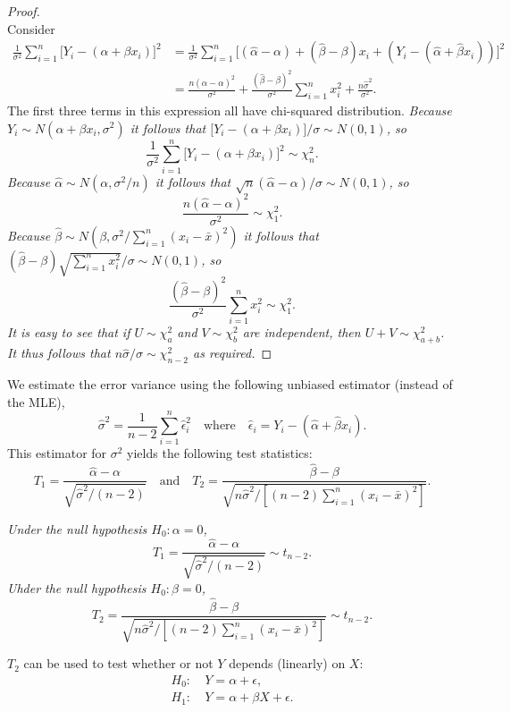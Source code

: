 \begin{proof}
\[\]
Consider
\begin{align*}
\frac{1}{\sigma^2}\sum_{i=1}^n\big[Y_i-(\alpha+\beta x_i)\big]^2 
	& = \frac{1}{\sigma^2}\sum_{i=1}^n\big[(\hat{\alpha}-\alpha) + (\hat{\beta}-\beta)x_i + (Y_i-(\hat{\alpha}+\hat{\beta}x_i))\big]^2 \\
	& = \frac{n(\hat{\alpha}-\alpha)^2}{\sigma^2} + \frac{(\hat{\beta}-\beta)^2}{\sigma^2}\sum_{i=1}^n x_i^2 + \frac{n\hat{\sigma}^2}{\sigma^2}.
\end{align*}
The first three terms in this expression all have chi-squared distribution.
\bit
\it
Because $Y_i\sim N(\alpha+\beta x_i,\sigma^2)$ it follows that $\big[Y_i-(\alpha+\beta x_i)\big]/\sigma\sim N(0,1)$, so
\[
\displaystyle\frac{1}{\sigma^2}\sum_{i=1}^n\big[Y_i-(\alpha+\beta x_i)\big]^2\sim\chi^2_{n}.
\]
\it
Because $\hat{\alpha}\sim N(\alpha,\sigma^2/n)$ it follows that $\sqrt{n}(\hat{\alpha}-\alpha)/\sigma\sim N(0,1)$, so
\[
\displaystyle\frac{n(\hat{\alpha}-\alpha)^2}{\sigma^2} \sim \chi^2_1.
\]
\it 
Because $\hat{\beta}\sim N\left(\beta,\sigma^2/\sum_{i=1}^n(x_i-\bar{x})^2\right)$ it follows that $(\hat{\beta}-\beta)\sqrt{\sum_{i=1}^n x_i^2}/\sigma \sim N(0,1)$, so
\[
\frac{(\hat{\beta}-\beta)^2}{\sigma^2}\sum_{i=1}^n x_i^2 \sim \chi^2_1.
\]
\eit
It is easy to see that if $U\sim\chi^2_a$ and $V\sim\chi^2_b$ are independent, then $U+V\sim\chi^2_{a+b}$. It thus follows that $n\hat{\sigma}/\sigma\sim \chi^2_{n-2}$ as required.
\een
\end{proof}

We estimate the error variance using the following unbiased estimator (instead of the MLE),
\[
\hat{\sigma}^2 = \frac{1}{n-2}\sum_{i=1}^n \hat{\epsilon}_i^2 
\quad\text{where}\quad
\hat{\epsilon}_i = Y_i-(\hat{\alpha}+\hat{\beta} x_i).
\]
This estimator for $\sigma^2$ yields the following test statistics:
\[
T_1 = \frac{\hat{\alpha}-\alpha}{\sqrt{\hat{\sigma}^2/(n-2)}}
\quad\text{and}\quad
T_2 = \frac{\hat{\beta}-\beta}{\sqrt{n\hat{\sigma}^2/[(n-2)\sum_{i=1}^n(x_i-\bar{x})^2]}}.
\]

\bit
\it Under the null hypothesis $H_0:\alpha=0$, 
\[
T_1 = \frac{\hat{\alpha}-\alpha}{\sqrt{\hat{\sigma}^2/(n-2)}} \sim t_{n-2}.
\]
\it Uhder the null hypothesis $H_0:\beta=0$,
\[
T_2 = \frac{\hat{\beta}-\beta}{\sqrt{n\hat{\sigma}^2/[(n-2)\sum_{i=1}^n(x_i-\bar{x})^2]}} \sim t_{n-2}.
\]
\eit

$T_2$ can be used to test whether or not $Y$ depends (linearly) on $X$:
\begin{align*}
H_0: 	&\ Y = \alpha+\epsilon, \\
H_1:	&\ Y = \alpha+\beta X + \epsilon.
\end{align*}

